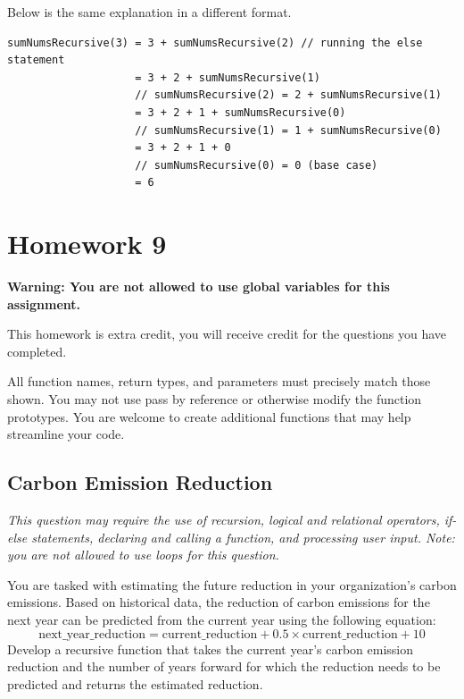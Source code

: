 Below is the same explanation in a different format.

\begin{verbatim}
sumNumsRecursive(3) = 3 + sumNumsRecursive(2) // running the else statement
                    = 3 + 2 + sumNumsRecursive(1) 
                    // sumNumsRecursive(2) = 2 + sumNumsRecursive(1)
                    = 3 + 2 + 1 + sumNumsRecursive(0) 
                    // sumNumsRecursive(1) = 1 + sumNumsRecursive(0)
                    = 3 + 2 + 1 + 0 
                    // sumNumsRecursive(0) = 0 (base case)
                    = 6
\end{verbatim}


\section{Homework 9}

\textbf{Warning: You are not allowed to use global variables for this assignment.}

This homework is extra credit, you will receive credit for the questions you have completed. 

All function names, return types, and parameters must precisely match those shown. You may not use pass by reference or otherwise modify the function prototypes. You are welcome to create additional functions that may help streamline your code.


\subsection{Carbon Emission Reduction} 
\textit{This question may require the use of recursion, logical and relational operators, if-else statements, declaring and calling a function, and processing user input. Note: you are not allowed to use loops for this question.} \newline

You are tasked with estimating the future reduction in your organization's carbon emissions. Based on historical data, the reduction of carbon emissions for the next year can be predicted from the current year using the following equation:
\begin{equation*}
\text{next\_year\_reduction} = \text{current\_reduction} + 0.5 \times \text{current\_reduction} + 10
\end{equation*}
Develop a recursive function that takes the current year's carbon emission reduction and the number of years forward for which the reduction needs to be predicted and returns the estimated reduction. 

